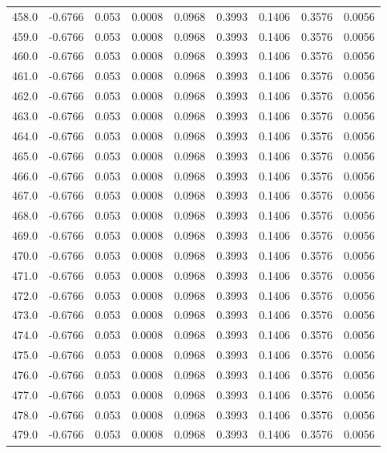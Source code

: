 \begin{longtable}{lrrrrrrrr}
458.0 & -0.6766 & 0.053 & 0.0008 & 0.0968 & 0.3993 & 0.1406 & 0.3576 & 0.0056 \\
459.0 & -0.6766 & 0.053 & 0.0008 & 0.0968 & 0.3993 & 0.1406 & 0.3576 & 0.0056 \\
460.0 & -0.6766 & 0.053 & 0.0008 & 0.0968 & 0.3993 & 0.1406 & 0.3576 & 0.0056 \\
461.0 & -0.6766 & 0.053 & 0.0008 & 0.0968 & 0.3993 & 0.1406 & 0.3576 & 0.0056 \\
462.0 & -0.6766 & 0.053 & 0.0008 & 0.0968 & 0.3993 & 0.1406 & 0.3576 & 0.0056 \\
463.0 & -0.6766 & 0.053 & 0.0008 & 0.0968 & 0.3993 & 0.1406 & 0.3576 & 0.0056 \\
464.0 & -0.6766 & 0.053 & 0.0008 & 0.0968 & 0.3993 & 0.1406 & 0.3576 & 0.0056 \\
465.0 & -0.6766 & 0.053 & 0.0008 & 0.0968 & 0.3993 & 0.1406 & 0.3576 & 0.0056 \\
466.0 & -0.6766 & 0.053 & 0.0008 & 0.0968 & 0.3993 & 0.1406 & 0.3576 & 0.0056 \\
467.0 & -0.6766 & 0.053 & 0.0008 & 0.0968 & 0.3993 & 0.1406 & 0.3576 & 0.0056 \\
468.0 & -0.6766 & 0.053 & 0.0008 & 0.0968 & 0.3993 & 0.1406 & 0.3576 & 0.0056 \\
469.0 & -0.6766 & 0.053 & 0.0008 & 0.0968 & 0.3993 & 0.1406 & 0.3576 & 0.0056 \\
470.0 & -0.6766 & 0.053 & 0.0008 & 0.0968 & 0.3993 & 0.1406 & 0.3576 & 0.0056 \\
471.0 & -0.6766 & 0.053 & 0.0008 & 0.0968 & 0.3993 & 0.1406 & 0.3576 & 0.0056 \\
472.0 & -0.6766 & 0.053 & 0.0008 & 0.0968 & 0.3993 & 0.1406 & 0.3576 & 0.0056 \\
473.0 & -0.6766 & 0.053 & 0.0008 & 0.0968 & 0.3993 & 0.1406 & 0.3576 & 0.0056 \\
474.0 & -0.6766 & 0.053 & 0.0008 & 0.0968 & 0.3993 & 0.1406 & 0.3576 & 0.0056 \\
475.0 & -0.6766 & 0.053 & 0.0008 & 0.0968 & 0.3993 & 0.1406 & 0.3576 & 0.0056 \\
476.0 & -0.6766 & 0.053 & 0.0008 & 0.0968 & 0.3993 & 0.1406 & 0.3576 & 0.0056 \\
477.0 & -0.6766 & 0.053 & 0.0008 & 0.0968 & 0.3993 & 0.1406 & 0.3576 & 0.0056 \\
478.0 & -0.6766 & 0.053 & 0.0008 & 0.0968 & 0.3993 & 0.1406 & 0.3576 & 0.0056 \\
479.0 & -0.6766 & 0.053 & 0.0008 & 0.0968 & 0.3993 & 0.1406 & 0.3576 & 0.0056 \\

\end{longtable}
